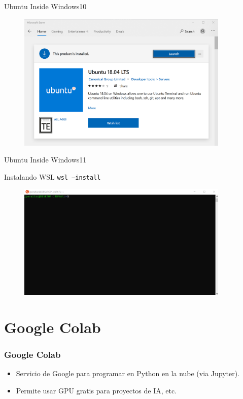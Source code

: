\documentclass[10pt]{beamer}
\begin{document}
\begin{frame}{Ubuntu Inside Windows10}
\begin{figure}
\includegraphics[width=0.9\textwidth]{ubuwin01.png}
\end{figure}
\end{frame}

\begin{frame}[fragile]{Ubuntu Inside Windows11}
\begin{block}{Instalando WSL}
\texttt{wsl --install}
\end{block}
\end{frame}

\begin{frame}
\begin{figure}
\includegraphics[width=0.9\textwidth]{ubuwin02.png}
\end{figure}
\end{frame}

\section{Google Colab}

\begin{frame}[fragile]
\frametitle{Google Colab}
\begin{itemize}
    \item Servicio de Google para programar en Python en la nube (via Jupyter).
    \item Permite usar GPU gratis para proyectos de IA, etc.
\end{itemize}
\end{frame}
\end{document}
